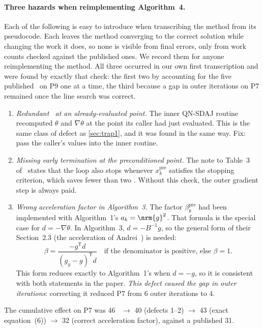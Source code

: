 \paragraph{Three hazards when reimplementing Algorithm~4.}
Each of the following is easy to introduce when transcribing the method from
its pseudocode. Each leaves the method converging to the correct solution
while changing the work it does, so none is visible from final errors, only
from work counts checked against the published ones. We record them for anyone
reimplementing the method. All three occurred in our own first transcription
and were found by exactly that check: the first two by accounting for the five
published \EVDs\ on P9 one at a time, the third because a gap in outer
iterations on P7 remained once the line search was correct.
\begin{enumerate}
  \item \emph{Redundant \EVD\ at an already-evaluated point.} The inner
    QN-SDAJ routine recomputed $\theta$ and $\nabla\theta$ at the point its
    caller had just evaluated. This is the same class of defect as
    \cref{sec:trap1}, and it was found in the same way. Fix: pass the
    caller's values into the inner routine.
  \item \emph{Missing early termination at the preconditioned point.} The
    note to Table~3 of~\cite{huynh2025accelerated} states that the loop also stops
    whenever $x_k^{\mathrm{pre}}$ satisfies the stopping criterion, which
    saves fewer than two \EVDs. Without this check, the outer gradient step is
    always paid.
  \item \emph{Wrong acceleration factor in Algorithm~3.} The factor
    $\beta_k^{\mathrm{pre}}$ had been implemented with Algorithm~1's
    $a_k=\nrm{g}^2$. That formula is the special case for $d=-\nabla\theta$.
    In Algorithm~3, $d=-B^{-1}g$, so the general form of their Section~2.3
    (the acceleration of Andrei~\cite{andrei2006acceleration}) is needed:
    \[
      \beta=\frac{-g^{\mathsf T}d}{(g_y-g)^{\mathsf T}d}\quad\text{if the denominator is positive, else }\beta=1.
    \]
    This form reduces exactly to Algorithm~1's when $d=-g$, so it is
    consistent with both statements in the paper. \emph{This defect caused
    the gap in outer iterations}: correcting it reduced P7 from 6 outer
    iterations to 4.
\end{enumerate}
The cumulative effect on P7 was 46 \EVDs\ $\to$ 40 (defects 1--2) $\to$ 43
(exact equation~(6)) $\to$ 32 (correct acceleration factor), against a
published 31.

